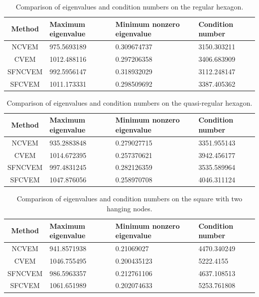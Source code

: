 \documentclass[10pt]{amsart}
\numberwithin{equation}{section}
\begin{document}
\begin{table}[htbp]
\centering
\caption{Comparison of eigenvalues and condition numbers on the regular hexagon.}
\label{tab:comparison0}
\begin{tabular}{c|p{3cm}<{\centering}p{3.5cm}<{\centering}p{3cm}<{\centering}}
\hline
\textbf{Method} & \textbf{Maximum eigenvalue} & \textbf{Minimum nonzero
eigenvalue} & \textbf{Condition number} \\ \hline
NCVEM & 975.5693189 & 0.309674737 & 3150.303211 \\ \hline
CVEM & 1012.488116 & 0.297206358 & 3406.683909 \\ \hline
SFNCVEM & 992.5956147 & 0.318932029 & 3112.248147 \\ \hline
SFCVEM & 1011.173331 & 0.298509692 & 3387.405362 \\
\hline
\end{tabular}
\end{table}
\begin{table}[htbp]
\centering
\caption{Comparison of eigenvalues and condition numbers on the quasi-regular hexagon.}
\label{tab:comparison1}
\begin{tabular}{c|p{3cm}<{\centering}p{3.5cm}<{\centering}p{3cm}<{\centering}}
\hline
\textbf{Method} & \textbf{Maximum eigenvalue} & \textbf{Minimum nonzero
eigenvalue} & \textbf{Condition number} \\ \hline
NCVEM   & 935.2883848 & 0.279027715 & 3351.955143 \\ \hline
CVEM    & 1014.672395 & 0.257370621 & 3942.456177 \\ \hline
SFNCVEM & 997.4831245 & 0.282126359 & 3535.589964 \\ \hline
SFCVEM  & 1047.876056 & 0.258970708 &
4046.311124 \\
\hline
\end{tabular}
\end{table}
\begin{table}[htbp]
\centering
\caption{Comparison of eigenvalues and condition numbers on the square with two hanging nodes.}
\label{tab:comparison2}
\begin{tabular}{c|p{3cm}<{\centering}p{3.5cm}<{\centering}p{3cm}<{\centering}}
\hline
\textbf{Method} & \textbf{Maximum eigenvalue} & \textbf{Minimum nonzero
eigenvalue} & \textbf{Condition number} \\ \hline
 NCVEM   & 941.8571938&	0.21069027	&4470.340249 \\ \hline
 CVEM    & 1046.755495&	0.200435123	&5222.4155 \\ \hline
 SFNCVEM & 986.5963357&	0.212761106	&4637.108513 \\ \hline
 SFCVEM  & 1061.651989&	0.202074633	&5253.761808 \\
\hline
\end{tabular}
\end{table}
\end{document}
